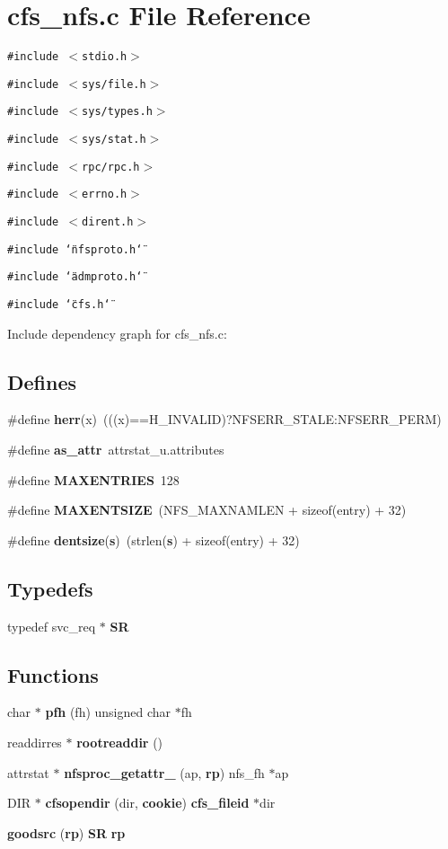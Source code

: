 \section{cfs\_\-nfs.c File Reference}
\label{cfs__nfs_8c}


{\tt \#include $<$stdio.h$>$}\par
{\tt \#include $<$sys/file.h$>$}\par
{\tt \#include $<$sys/types.h$>$}\par
{\tt \#include $<$sys/stat.h$>$}\par
{\tt \#include $<$rpc/rpc.h$>$}\par
{\tt \#include $<$errno.h$>$}\par
{\tt \#include $<$dirent.h$>$}\par
{\tt \#include \char`\"{}nfsproto.h\char`\"{}}\par
{\tt \#include \char`\"{}admproto.h\char`\"{}}\par
{\tt \#include \char`\"{}cfs.h\char`\"{}}\par


Include dependency graph for cfs\_\-nfs.c:\subsection*{Defines}
\begin{CompactItemize}
\item 
\#define {\bf herr}(x)\ (((x)==H\_\-INVALID)?NFSERR\_\-STALE:NFSERR\_\-PERM)
\item 
\#define {\bf as\_\-attr}\ attrstat\_\-u.attributes
\item 
\#define {\bf MAXENTRIES}\ 128
\item 
\#define {\bf MAXENTSIZE}\ (NFS\_\-MAXNAMLEN + sizeof(entry) + 32)
\item 
\#define {\bf dentsize}({\bf s})\ (strlen({\bf s}) + sizeof(entry) + 32)
\end{CompactItemize}
\subsection*{Typedefs}
\begin{CompactItemize}
\item 
typedef svc\_\-req $\ast$ {\bf SR}
\end{CompactItemize}
\subsection*{Functions}
\begin{CompactItemize}
\item 
char $\ast$ {\bf pfh} (fh) unsigned char $\ast$fh
\item 
readdirres $\ast$ {\bf rootreaddir} ()
\item 
attrstat $\ast$ {\bf nfsproc\_\-getattr\_} (ap, {\bf rp}) nfs\_\-fh $\ast$ap
\item 
DIR $\ast$ {\bf cfsopendir} (dir, {\bf cookie}) {\bf cfs\_\-fileid} $\ast$dir
\item 
{\bf goodsrc} ({\bf rp}) {\bf SR} {\bf rp}
\end{CompactItemize}
